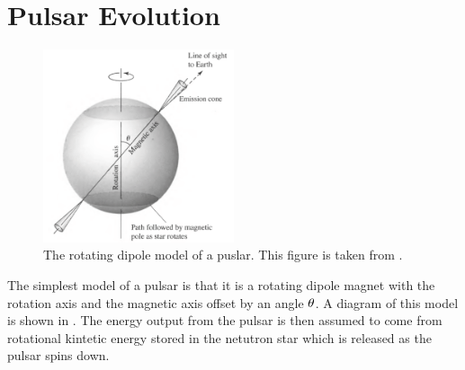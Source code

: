 \section{Pulsar Evolution}








\begin{figure}[htpb]
  \begin{center}
    \includegraphics[width=0.5\textwidth]{chapters/pulsar_pwn_system/figures/pulsar_model.pdf}
  \end{center}
  \caption{The rotating dipole model
  of a puslar. This
  figure is taken from \citep{carroll_2006_introduction-modern}.
  }
\end{figure}

The simplest model of a pulsar is that it is a rotating dipole magnet
with the rotation axis and the magnetic axis offset by an angle
$\theta$.
A diagram of this model is shown in .
The energy output from the pulsar is
then assumed 
to come from rotational kintetic energy stored in
the netutron star which is released as the pulsar
spins down. 

